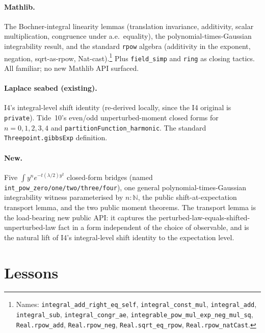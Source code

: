 \documentclass[11pt]{article}
\begin{document}
\paragraph{Mathlib.} The Bochner-integral linearity lemmas
(translation invariance, additivity, scalar multiplication, congruence
under a.e.\ equality), the polynomial-times-Gaussian integrability
result, and the standard \texttt{rpow} algebra (additivity in the
exponent, negation, sqrt-as-rpow, Nat-cast).\footnote{Names:
\texttt{integral\_add\_right\_eq\_self}, \texttt{integral\_const\_mul},
\texttt{integral\_add}, \texttt{integral\_sub},
\texttt{integral\_congr\_ae},
\texttt{integrable\_pow\_mul\_exp\_neg\_mul\_sq},
\texttt{Real.rpow\_add}, \texttt{Real.rpow\_neg},
\texttt{Real.sqrt\_eq\_rpow}, \texttt{Real.rpow\_natCast}.}
Plus \texttt{field\_simp} and \texttt{ring} as closing tactics. All
familiar; no new Mathlib API surfaced.

\paragraph{Laplace seabed (existing).} I4's integral-level shift
identity (re-derived locally, since the I4 original is
\texttt{private}). Tide~10's even/odd unperturbed-moment closed forms
for $n = 0, 1, 2, 3, 4$ and \texttt{partitionFunction\_harmonic}. The
standard \texttt{Threepoint.gibbsExp} definition.

\paragraph{New.} Five $\int y^n e^{-t(\lambda/2)y^2}$ closed-form
bridges (named \texttt{int\_pow\_zero/one/two/three/four}), one
general polynomial-times-Gaussian integrability witness
parameterised by $n : \mathbb N$, the public shift-at-expectation
transport lemma, and the two public moment theorems. The transport
lemma is the load-bearing new public API: it captures the
perturbed-law-equals-shifted-unperturbed-law fact in a form
independent of the choice of observable, and is the natural lift of
I4's integral-level shift identity to the expectation level.

\section{Lessons}
\end{document}
